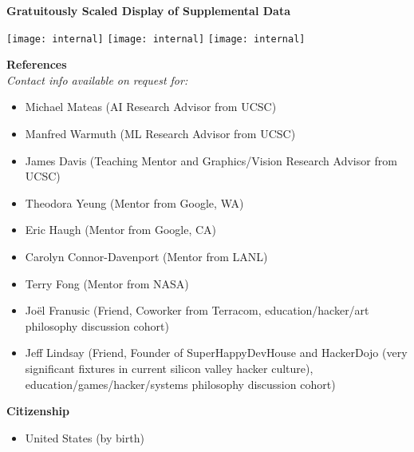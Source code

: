 \documentclass[10pt]{article}
\begin{document}
\newpage
{\large \textbf{Gratuitously Scaled Display of Supplemental Data}}

\begin{minipage}{\textwidth}
\texttt{[image: internal]}
\texttt{[image: internal]}
\texttt{[image: internal]}
\end{minipage}


{\large \textbf{References}}\\

\textit{Contact info available on request for:}\\
\begin{itemize}
  \item Michael Mateas (AI Research Advisor from UCSC)
  \item Manfred Warmuth (ML Research Advisor from UCSC)
  \item James Davis (Teaching Mentor and Graphics/Vision Research Advisor from UCSC)
  \item Theodora Yeung (Mentor from Google, WA)
  \item Eric Haugh (Mentor from Google, CA)
  \item Carolyn Connor-Davenport (Mentor from LANL)
  \item Terry Fong (Mentor from NASA)
  \item Jo\"{e}l Franusic (Friend, Coworker from Terracom, education/hacker/art philosophy discussion cohort)
  \item Jeff Lindsay (Friend, Founder of SuperHappyDevHouse and HackerDojo (very significant fixtures in current silicon valley hacker culture), education/games/hacker/systems philosophy discussion cohort)
\end{itemize}

{\large \textbf{Citizenship}}
\begin{itemize}
  \item United States (by birth)
\end{itemize}


\vspace{0.25in}
\end{document}
